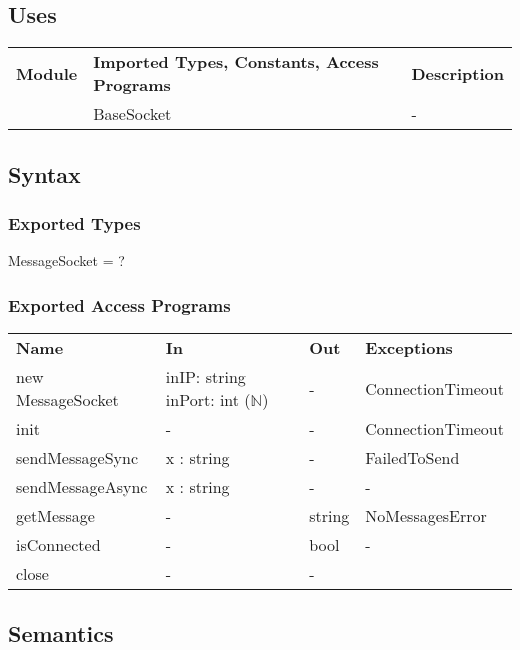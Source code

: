 \documentclass[12pt, titlepage]{article}
\begin{document}
\subsection{Uses}
\begin{center}
\begin{tabular}{p{2 cm} p{5cm} p{5.5cm} }
\hline
\textbf{Module} & \textbf{Imported Types, Constants, Access Programs} & \textbf{Description}  \\
\nameref{Base Socket} & BaseSocket & - \\
\hline
\hline
\end{tabular}
\end{center}
\subsection{Syntax}
\subsubsection{Exported Types}
MessageSocket =  ?
\subsubsection{Exported Access Programs}
\begin{center}
\begin{tabular}{p{3.5cm} p{2.5cm} p{2.5cm} p{5cm}}
\hline
\textbf{Name} & \textbf{In} & \textbf{Out} & \textbf{Exceptions} \\
new MessageSocket & inIP: string inPort: int ($\mathbb{N}$) & - & ConnectionTimeout \\
\hline
init & - & - & ConnectionTimeout \\
\hline
sendMessageSync & x : string & - & FailedToSend \\
\hline
sendMessageAsync & x : string & - & - \\
\hline
getMessage & - & string & NoMessagesError \\
\hline
isConnected & - & bool & - \\
\hline
close & - & - & \\
\hline
\hline
\end{tabular}
\end{center}
\subsection{Semantics}
\end{document}
